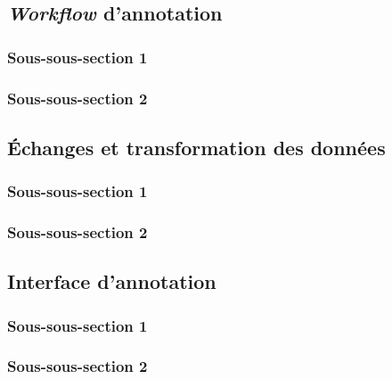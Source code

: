 
\subsection{\textit{Workflow} d'annotation}
    \subsubsection{Sous-sous-section 1}

    
    \subsubsection{Sous-sous-section 2}

    
    \subsection{Échanges et transformation des données}
        \subsubsection{Sous-sous-section 1}


        \subsubsection{Sous-sous-section 2}


    \subsection{Interface d’annotation}
        \subsubsection{Sous-sous-section 1}


        \subsubsection{Sous-sous-section 2}

